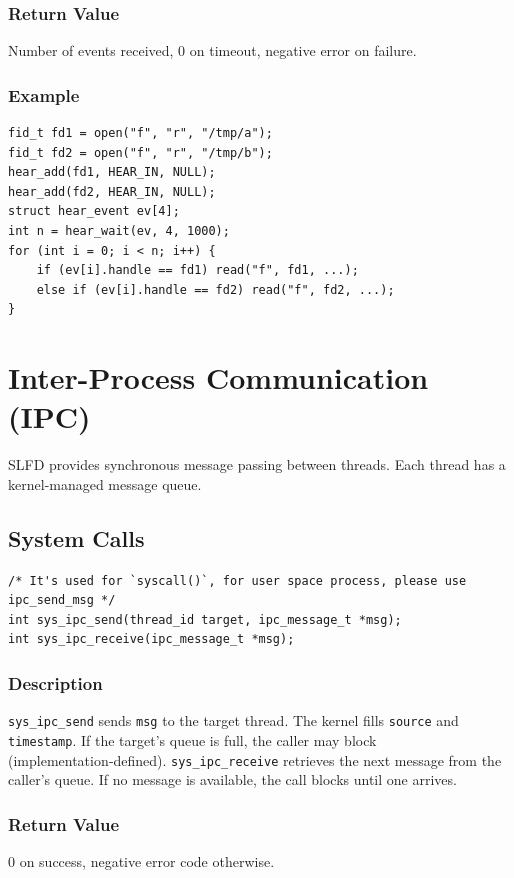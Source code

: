 \documentclass[12pt,a4paper]{article}
\begin{document}
\subsubsection{Return Value}
Number of events received, 0 on timeout, negative error on failure.

\subsubsection{Example}
\begin{lstlisting}
fid_t fd1 = open("f", "r", "/tmp/a");
fid_t fd2 = open("f", "r", "/tmp/b");
hear_add(fd1, HEAR_IN, NULL);
hear_add(fd2, HEAR_IN, NULL);
struct hear_event ev[4];
int n = hear_wait(ev, 4, 1000);
for (int i = 0; i < n; i++) {
    if (ev[i].handle == fd1) read("f", fd1, ...);
    else if (ev[i].handle == fd2) read("f", fd2, ...);
}
\end{lstlisting}
\section{Inter-Process Communication (IPC)}

SLFD provides synchronous message passing between threads. Each thread has a kernel‑managed message queue.

\subsection{System Calls}
\begin{lstlisting}
/* It's used for `syscall()`, for user space process, please use ipc_send_msg */
int sys_ipc_send(thread_id target, ipc_message_t *msg);
int sys_ipc_receive(ipc_message_t *msg);
\end{lstlisting}

\subsubsection{Description}
\texttt{sys\_ipc\_send} sends \texttt{msg} to the target thread. The kernel fills \texttt{source} and \texttt{timestamp}. If the target's queue is full, the caller may block (implementation‑defined). \texttt{sys\_ipc\_receive} retrieves the next message from the caller's queue. If no message is available, the call blocks until one arrives.

\subsubsection{Return Value}
0 on success, negative error code otherwise.
\end{document}
